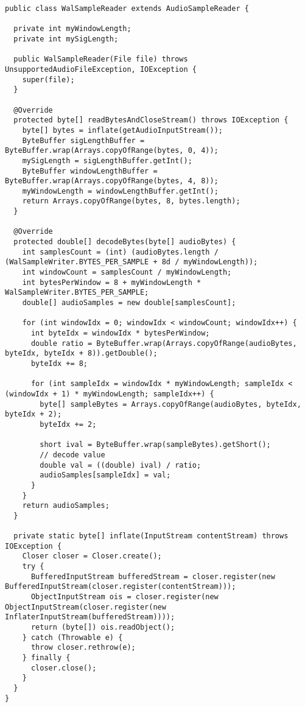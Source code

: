 \begin{lstlisting}[caption={Чтение wal файла}]
public class WalSampleReader extends AudioSampleReader {

  private int myWindowLength;
  private int mySigLength;

  public WalSampleReader(File file) throws UnsupportedAudioFileException, IOException {
    super(file);
  }

  @Override
  protected byte[] readBytesAndCloseStream() throws IOException {
    byte[] bytes = inflate(getAudioInputStream());
    ByteBuffer sigLengthBuffer = ByteBuffer.wrap(Arrays.copyOfRange(bytes, 0, 4));
    mySigLength = sigLengthBuffer.getInt();
    ByteBuffer windowLengthBuffer = ByteBuffer.wrap(Arrays.copyOfRange(bytes, 4, 8));
    myWindowLength = windowLengthBuffer.getInt();
    return Arrays.copyOfRange(bytes, 8, bytes.length);
  }

  @Override
  protected double[] decodeBytes(byte[] audioBytes) {
    int samplesCount = (int) (audioBytes.length / (WalSampleWriter.BYTES_PER_SAMPLE + 8d / myWindowLength));
    int windowCount = samplesCount / myWindowLength;
    int bytesPerWindow = 8 + myWindowLength * WalSampleWriter.BYTES_PER_SAMPLE;
    double[] audioSamples = new double[samplesCount];

    for (int windowIdx = 0; windowIdx < windowCount; windowIdx++) {
      int byteIdx = windowIdx * bytesPerWindow;
      double ratio = ByteBuffer.wrap(Arrays.copyOfRange(audioBytes, byteIdx, byteIdx + 8)).getDouble();
      byteIdx += 8;

      for (int sampleIdx = windowIdx * myWindowLength; sampleIdx < (windowIdx + 1) * myWindowLength; sampleIdx++) {
        byte[] sampleBytes = Arrays.copyOfRange(audioBytes, byteIdx, byteIdx + 2);
        byteIdx += 2;

        short ival = ByteBuffer.wrap(sampleBytes).getShort();
        // decode value
        double val = ((double) ival) / ratio;
        audioSamples[sampleIdx] = val;
      }
    }
    return audioSamples;
  }

  private static byte[] inflate(InputStream contentStream) throws IOException {
    Closer closer = Closer.create();
    try {
      BufferedInputStream bufferedStream = closer.register(new BufferedInputStream(closer.register(contentStream)));
      ObjectInputStream ois = closer.register(new ObjectInputStream(closer.register(new InflaterInputStream(bufferedStream))));
      return (byte[]) ois.readObject();
    } catch (Throwable e) {
      throw closer.rethrow(e);
    } finally {
      closer.close();
    }
  }
}
\end{lstlisting}

